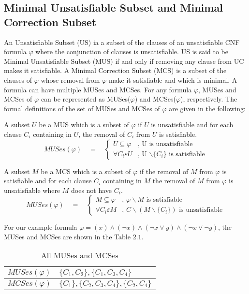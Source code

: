 \subsection{Minimal Unsatisfiable Subset and Minimal Correction Subset}
An Unsatisfiable Subset (US) ia a subset of the clauses of an unsatisfiable CNF formula $\varphi$ where the conjunction of clauses is unsatisfiable. US is said to be Minimal Unsatisfiable Subset (MUS) if and only if removing any clause from UC makes it satisfiable. A Minimal Correction Subset (MCS) is a subset of the clauses of $\varphi$ whose removal from $\varphi$ make it satisfiable and which is minimal. A formula can have multiple MUSes and MCSes. For any formula $\varphi$, MUSes and MCSes of $\varphi$ can be represented as MUSes($\varphi$) and MCSes($\varphi$), respectively. The formal definitions of the set of MUSes and MCSes of $\varphi$ are given in the following:
\begin{definition}[MUS]
	\label{def:mus}
A subset $U$ be a MUS which is a subset of $\varphi$ if $U$ is unsatisfiable and for each clause $C_{i}$ containing in $U$, the removal of $C_{i}$ from $U$ is satisfiable.
$$MUSes(\varphi)
\quad = \quad 
\left\{
\begin{array}{ll}
{\displaystyle U \subseteq \varphi} 
& 
\text{, U is unsatisfiable }
\\[0.6cm] %
{\displaystyle\forall C_{i} \varepsilon U} & \text{, U $\backslash \{C_{i}\}$ is satisfiable}
\end{array}
\right.$$
\end{definition}
\begin{definition}[MCS]
	\label{def:mcs}
A subset $M$ be a MCS which is a subset of $\varphi$ if the removal of $M$ from $\varphi$ is satisfiable and for each clause $C_{i}$ containing in $M$ the removal of $M$ from $\varphi$ is unsatisfiable where $M$ does not have $C_{i}$.
$$MUSes(\varphi)
\quad = \quad 
\left\{
\begin{array}{ll}
{\displaystyle M \subseteq \varphi} 
& 
\text{, $\varphi\backslash M$ is satisfiable}
\\[0.6cm] %
{\displaystyle\forall C_{i} \varepsilon M} & \text{, $C\backslash(M\backslash\{C_{i}\})$ is unsatisfiable}
\end{array}
\right.$$
\end{definition}
For our example formula $\varphi=(x)\wedge(\neg x)\wedge(\neg x\vee y)\wedge(\neg x \vee \neg y)$, the MUSes and MCSes are shown in the Table $2.1$.
\begin{table}[]
	\centering
	\caption{All MUSes and MCSes}
	\label{my-label}
	\begin{tabular}{|l|l|}
		\hline
		$MUSes(\varphi)$ & $\{C_{1},C_{2}\},\{C_{1},C_{3},C_{4}\}$ \\ \hline
		$MCSes(\varphi)$ & $\{C_{1}\},\{C_{2},C_{3},C_{4}\},\{C_{2},C_{4}\}$ \\ \hline
	\end{tabular}
\end{table}
